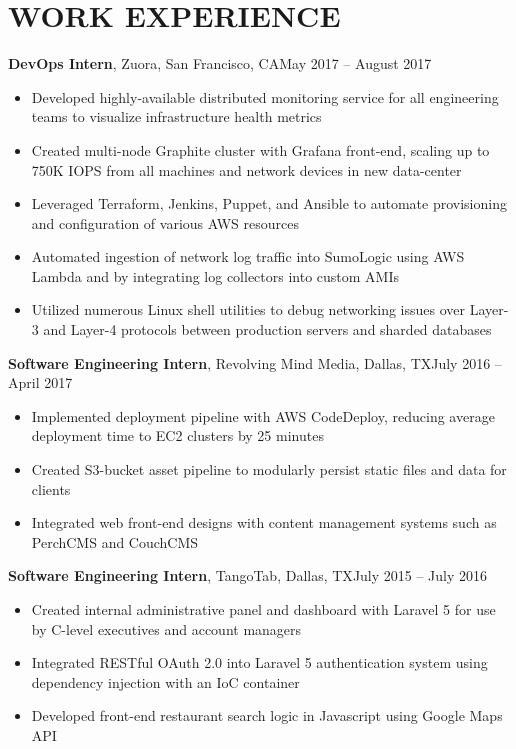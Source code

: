 \documentclass{./templates/resume}
\begin{document}
\maketitle

\section{WORK EXPERIENCE}
\textbf{DevOps Intern}, Zuora, San Francisco, CA\hfill{May 2017 -- August 2017}
\begin{itemize}\itemsep0.3em
\item Developed highly-available distributed monitoring service for all engineering teams to visualize infrastructure health metrics
\item Created multi-node Graphite cluster with Grafana front-end, scaling up to 750K IOPS from all machines and network devices in new data-center
\item Leveraged Terraform, Jenkins, Puppet, and Ansible to automate provisioning and configuration of various AWS resources
\item Automated ingestion of network log traffic into SumoLogic using AWS Lambda and by integrating log collectors into custom AMIs
\item Utilized numerous Linux shell utilities to debug networking issues over Layer-3 and Layer-4 protocols between production servers and sharded databases
\end{itemize}\vspace{5pt}

\textbf{Software Engineering Intern}, Revolving Mind Media, Dallas, TX\hfill{July 2016 -- April 2017}
\begin{itemize}\itemsep0.3em
\item Implemented deployment pipeline with AWS CodeDeploy, reducing average deployment time to EC2 clusters by 25 minutes
\item Created S3-bucket asset pipeline to modularly persist static files and data for clients
\item Integrated web front-end designs with content management systems such as PerchCMS and CouchCMS
\end{itemize}\vspace{5pt}

\textbf{Software Engineering Intern}, TangoTab, Dallas, TX\hfill{July 2015 -- July 2016}
\begin{itemize}\itemsep0.3em
\item Created internal administrative panel and dashboard with Laravel 5 for use by C-level executives and account managers
\item Integrated RESTful OAuth 2.0 into Laravel 5 authentication system using dependency injection with an IoC container
\item Developed front-end restaurant search logic in Javascript using Google Maps API
\end{itemize}\vspace{5pt}
\end{document}

